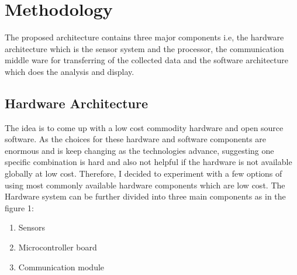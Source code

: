 \documentclass[11pt]{article}
\begin{document}
\section{Methodology}
The proposed architecture contains three major components i.e, the hardware architecture which is the sensor system and the processor, the communication middle ware for transferring of the collected data and the software architecture which does the analysis and display.

\subsection{Hardware Architecture}

The idea is to come up with a low cost commodity hardware and  open source software. As the choices for these hardware and software components are enormous and is keep changing as the technologies advance, suggesting one specific combination is hard and also not helpful if the hardware is not available globally at low cost. Therefore, I decided to experiment with a few options of using most commonly available hardware components which are low cost. 
The Hardware system can be further divided into three main components as in the figure 1:
\begin{enumerate}
\item  Sensors
\item  Microcontroller board
\item  Communication module
\end{enumerate}
\end{document}
